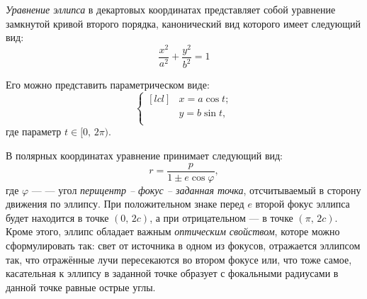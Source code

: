 
{\itshape Уравнение эллипса} в декартовых координатах 
представляет собой уравнение замкнутой кривой второго 
порядка, канонический вид которого имеет следующий вид:
\begin{equation}
\frac{x^2}{a^2}+\frac{y^2}{b^2}=1
\end{equation}

Его можно представить параметрическом виде:\begin{equation}
\left\{\begin{aligned}[lcl]
&x=a\cos t;\\
&y=b\sin t,\\
\end{aligned}
\right.
\end{equation}
где параметр $t \in [0, \, 2\pi)$.

В полярных координатах уравнение принимает следующий вид:
\begin{equation}
r=\frac{p}{1\pm e \cos \varphi},
\end{equation} 
где $\varphi$ ---  --- угол 
{\slshape перицентр -- фокус -- заданная точка}, 
отсчитываемый в сторону движения по эллипсу. При 
положительном знаке перед $e$ второй фокус эллипса будет 
находится в точке $(0, \, 2c)$, а при отрицательном --- в 
точке $(\pi, \, 2c)$.\\

Кроме этого, эллипс обладает важным {\itshape оптическим 
свойством}, которе можно сформулировать так: свет от источника в одном из фокусов, 
	отражается эллипсом так, что отражённые лучи пересекаются 
	во втором фокусе или, что тоже самое, касательная к эллипсу в заданной точке образует с фокальными радиусами в данной точке равные острые углы.






 
